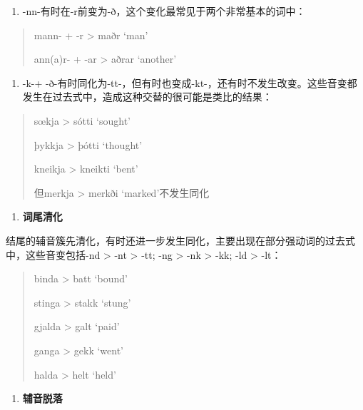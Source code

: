 \begin{enumerate}
  \def\labelenumi{(\alph{enumi})}
  \setcounter{enumi}{3}
  \item
        -nn-有时在-r前变为-ð，这个变化最常见于两个非常基本的词中：
\end{enumerate}

\begin{quote}
  mann- + -r \textgreater{} maðr `man'

  ann(a)r- + -ar \textgreater{} aðrar `another'
\end{quote}

\begin{enumerate}
  \def\labelenumi{(\alph{enumi})}
  \setcounter{enumi}{4}
  \item
        -k-+
        -ð-有时同化为-tt-，但有时也变成-kt-，还有时不发生改变。这些音变都发生在过去式中，造成这种交替的很可能是类比的结果：
\end{enumerate}

\begin{quote}
  sœkja \textgreater{} sótti `sought'

  þykkja \textgreater{} þótti `thought'

  kneikja \textgreater{} kneikti `bent'

  但merkja \textgreater{} merkði `marked'不发生同化
\end{quote}

\begin{enumerate}
  \def\labelenumi{\Alph{enumi}.}
  \setcounter{enumi}{1}
  \item
        \textbf{词尾清化}
\end{enumerate}

结尾的辅音簇先清化，有时还进一步发生同化，主要出现在部分强动词的过去式中，这些音变包括-nd
\textgreater{} -nt \textgreater{} -tt; -ng \textgreater{} -nk
\textgreater{} -kk; -ld \textgreater{} -lt：

\begin{quote}
  binda \textgreater{} batt `bound'

  stinga \textgreater{} stakk `stung'

  gjalda \textgreater{} galt `paid'

  ganga \textgreater{} gekk `went'

  halda \textgreater{} helt `held'
\end{quote}

\begin{enumerate}
  \def\labelenumi{\Alph{enumi}.}
  \setcounter{enumi}{2}
  \item
        \textbf{辅音脱落}
\end{enumerate}

